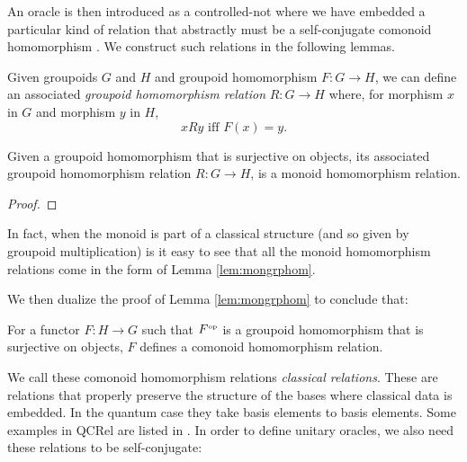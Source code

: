 An oracle is then introduced as a controlled-not where we have embedded a particular kind of relation that abstractly must be a self-conjugate comonoid homomorphism \cite{zeng2014abstract}. We construct such relations in the following lemmas.

\begin{defn}
Given groupoids $G$ and $H$ and groupoid homomorphism $F:G\to H$, we can define an associated \emph{groupoid homomorphism relation} $R:G\to H$ where, for morphism $x$ in $G$ and morphism $y$ in $H$,
$$
xRy \mbox{ iff }F(x) = y.
$$
\end{defn}

\begin{lemma}
\label{lem:mongrphom}
Given a groupoid homomorphism that is surjective on objects, its associated groupoid homomorphism relation $R:G\to H$, is a monoid homomorphism relation.
\end{lemma}
\begin{proof}
\end{proof}

\noindent In fact, when the monoid is part of a classical structure (and so given by groupoid multiplication) is it easy to see that all the monoid homomorphism relations come in the form of Lemma \ref{lem:mongrphom}.

We then dualize the proof of Lemma \ref{lem:mongrphom} to conclude that:
\begin{lemma}
\label{lem:classicalRelation}
For a functor $F:H\to G$ such that $F^{\mbox{\tiny op}}$ is a groupoid homomorphism that is surjective on objects, $F$ defines a comonoid homomorphism relation.
\end{lemma}
\noindent We call these comonoid homomorphism relations \emph{classical relations}. These are relations that properly preserve the structure of the bases where classical data is embedded.  In the quantum case they take basis elements to basis elements. Some examples in QCRel are listed in . In order to define unitary oracles, we also need these relations to be self-conjugate:

